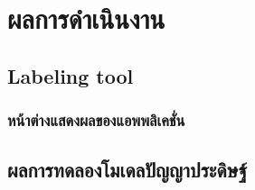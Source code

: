 \chapter{ผลการดำเนินงาน}
\section{Labeling tool}
\subsection{หน้าต่างแสดงผลของแอพพลิเคชั่น}


\clearpage
\section{ผลการทดลองโมเดลปัญญาประดิษฐ์}

%
%


%

%